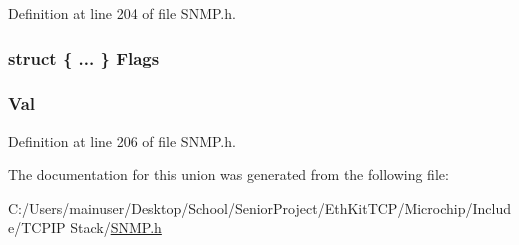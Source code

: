 Definition at line 204 of file S\+N\+M\+P.\+h.

\hypertarget{union_i_n_d_e_x___i_n_f_o_a7eae2f70d934c7ec97c4c2530f9e5e17}{}
\subsubsection[{Flags}]{\setlength{\rightskip}{0pt plus 5cm}struct \{ ... \}   Flags}\label{union_i_n_d_e_x___i_n_f_o_a7eae2f70d934c7ec97c4c2530f9e5e17}
\hypertarget{union_i_n_d_e_x___i_n_f_o_a5ab8c2bf45b20b5f7aa3a4f083896cec}{}
\subsubsection[{Val}]{ Val}\label{union_i_n_d_e_x___i_n_f_o_a5ab8c2bf45b20b5f7aa3a4f083896cec}


Definition at line 206 of file S\+N\+M\+P.\+h.



The documentation for this union was generated from the following file\+:\begin{DoxyCompactItemize}
\item 
C\+:/\+Users/mainuser/\+Desktop/\+School/\+Senior\+Project/\+Eth\+Kit\+T\+C\+P/\+Microchip/\+Include/\+T\+C\+P\+I\+P Stack/\hyperlink{_s_n_m_p_8h}{S\+N\+M\+P.\+h}\end{DoxyCompactItemize}
